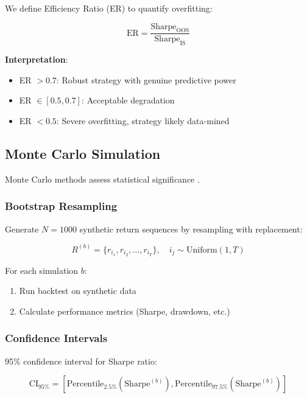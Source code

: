 \documentclass[12pt,a4paper]{article}
\begin{document}
We define Efficiency Ratio (ER) to quantify overfitting:

\begin{equation}
\text{ER} = \frac{\text{Sharpe}_{\text{OOS}}}{\text{Sharpe}_{\text{IS}}}
\end{equation}

\textbf{Interpretation}:
\begin{itemize}
    \item ER $> 0.7$: Robust strategy with genuine predictive power
    \item ER $\in [0.5, 0.7]$: Acceptable degradation
    \item ER $< 0.5$: Severe overfitting, strategy likely data-mined
\end{itemize}

\subsection{Monte Carlo Simulation}

Monte Carlo methods assess statistical significance \citep{efron1994introduction}.

\subsubsection{Bootstrap Resampling}

Generate $N = 1000$ synthetic return sequences by resampling with replacement:

\begin{equation}
R^{(b)} = \{r_{i_1}, r_{i_2}, \ldots, r_{i_T}\}, \quad i_j \sim \text{Uniform}(1, T)
\end{equation}

For each simulation $b$:
\begin{enumerate}
    \item Run backtest on synthetic data
    \item Calculate performance metrics (Sharpe, drawdown, etc.)
\end{enumerate}

\subsubsection{Confidence Intervals}

95\% confidence interval for Sharpe ratio:

\begin{equation}
\text{CI}_{95\%} = [\text{Percentile}_{2.5\%}(\text{Sharpe}^{(b)}), \text{Percentile}_{97.5\%}(\text{Sharpe}^{(b)})]
\end{equation}
\end{document}
